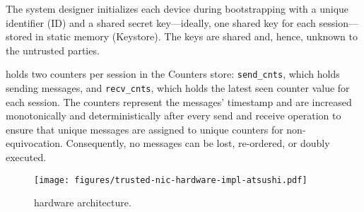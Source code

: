 The system designer initializes each \projecttitle{} device during bootstrapping with a unique identifier (ID) and a shared secret key---ideally, one shared key for each session---stored in static memory (Keystore). The keys are shared and, hence, unknown to the untrusted parties. 


\projecttitle{} holds two counters per session in the Counters store: \texttt{send\_cnts}, which holds sending messages, and \texttt{recv\_cnts}, which holds the latest seen counter value for each session. The counters represent the messages' timestamp and are increased monotonically and deterministically after every send and receive operation to ensure that unique messages are assigned to unique counters for non-equivocation. Consequently, no messages can be lost, re-ordered, or doubly executed.


\begin{figure}[t!]
    \centering
     \texttt{[image: figures/trusted-nic-hardware-impl-atsushi.pdf]}
    \caption{\projecttitle{} hardware architecture.}
     \label{fig:hardware-design}
\end{figure}





